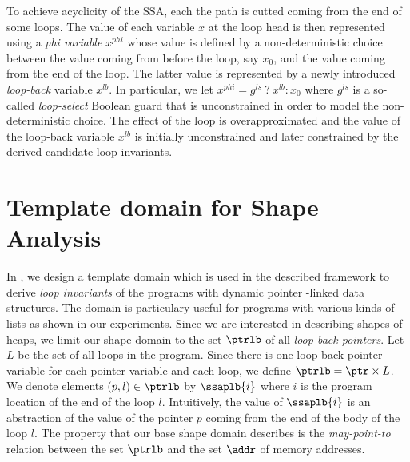 {To achieve acyclicity of the SSA, each the path is cutted coming from the end of some loops.
The value of each variable $x$ at the loop head is then represented using a
\emph{phi variable} $x^{phi}$ whose value is defined by a non-deterministic
choice between the value coming from before the loop, say $x_0$, and the
value coming from the end of the loop. The latter value is represented by a
newly introduced \emph{loop-back} variable $x^{lb}$. In particular, we let
$x^{phi} = g^{ls} ~?~ x^{lb} : x_0$ where $g^{ls}$ is a so-called
\emph{loop-select} Boolean guard that is unconstrained in order to model the
non-deterministic choice. 
The effect of the loop is overapproximated and 
the value of the loop-back variable $x^{lb}$ is initially unconstrained
and later constrained by the derived candidate loop invariants.

\section{Template domain for Shape Analysis}
In \cite{fmcad18}, we design a template domain which is used in the described framework to
derive \emph{loop invariants} of the programs with dynamic pointer -linked data structures.
The domain is particulary useful for programs with various kinds of lists as shown in our experiments.
%
Since we are interested in describing shapes of heaps,
we limit our shape domain to the set $\ptrlb$ of all \emph{loop-back pointers}. 
%
Let $L$ be the set of all loops in the program. 
%
Since there is one loop-back pointer variable for each pointer variable and
each loop, we define $\ptrlb = \ptr \times L$.
%
We denote elements $(p, l) \in \ptrlb$ by $\ssaplb{i}$ where $i$ is the program
location of the end of the loop $l$.
%
Intuitively, the value of $\ssaplb{i}$ is an abstraction of the value of the
pointer $p$ coming from the end of the body of the loop $l$.
%
The property that our base shape domain describes is the
\emph{may-point-to} relation between the set $\ptrlb$ and the set
$\addr$ of memory addresses.

}
